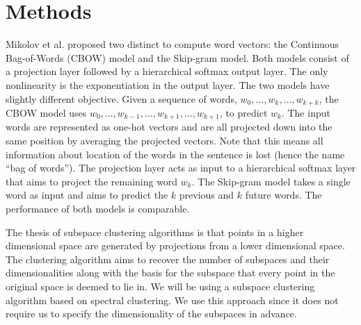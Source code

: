 \section{Methods}\label{sec:methods}

Mikolov et al. proposed two distinct to compute word vectors: the Continuous Bag-of-Words (CBOW) model and the Skip-gram model. 
Both models consist of a projection layer followed by a hierarchical softmax output layer. 
The only nonlinearity is the exponentiation in the output layer. 
The two models have slightly different objective. 
Given a sequence of words, $w_0, \hdots , w_k, \hdots, w_{k+k}$, the CBOW model uses $w_0, \hdots, w_{k-1}, \hdots, w_{k+1}, \hdots, w_{k+1}$, to predict $w_k$. 
The input words are represented as one-hot vectors and are all projected down into the same position by averaging the projected vectors. 
Note that this means all information about location of the words in the sentence is lost (hence the name “bag of words”). 
The projection layer acts as input to a hierarchical softmax layer that aims to project the remaining word $w_k$. 
The Skip-gram model takes a single word as input and aims to predict the $k$ previous and $k$ future words. 
The performance of both models is comparable.

	The thesis of subspace clustering algorithms is that points in a higher dimensional space are generated by projections from a lower dimensional space. 
The clustering algorithm aims to recover the number of subspaces and their dimensionalities along with the basis for the subspace that every point in the original space is deemed to lie in. 
We will be using a subspace clustering algorithm based on spectral clustering. We use this approach since it does not require us to specify the dimensionality of the subspaces in advance.

